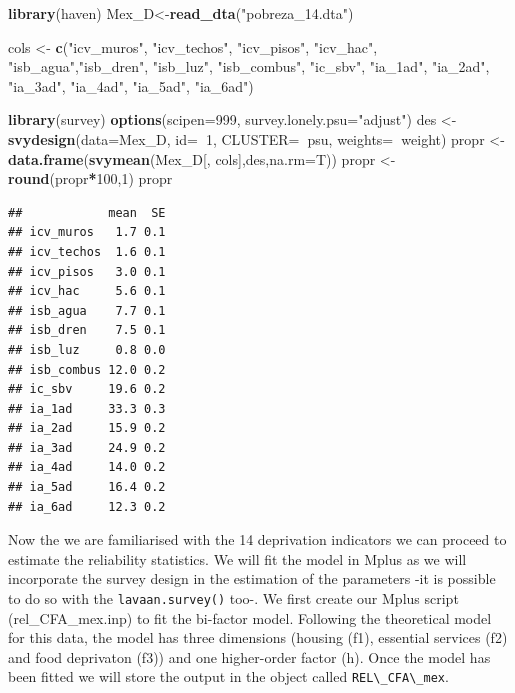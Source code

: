 \documentclass[]{book}
\newenvironment{Shaded}{\begin{snugshade}}{\end{snugshade}}
\newcommand{\DataTypeTok}[1]{\textcolor[rgb]{0.13,0.29,0.53}{#1}}
\newcommand{\DecValTok}[1]{\textcolor[rgb]{0.00,0.00,0.81}{#1}}
\newcommand{\KeywordTok}[1]{\textcolor[rgb]{0.13,0.29,0.53}{\textbf{#1}}}
\newcommand{\NormalTok}[1]{#1}
\newcommand{\OperatorTok}[1]{\textcolor[rgb]{0.81,0.36,0.00}{\textbf{#1}}}
\newcommand{\StringTok}[1]{\textcolor[rgb]{0.31,0.60,0.02}{#1}}
\begin{document}
\begin{Shaded}
\begin{Highlighting}[]
\KeywordTok{library}\NormalTok{(haven)}
\NormalTok{Mex_D<-}\KeywordTok{read_dta}\NormalTok{(}\StringTok{"pobreza_14.dta"}\NormalTok{)}

\NormalTok{cols <-}\StringTok{ }\KeywordTok{c}\NormalTok{(}\StringTok{"icv_muros"}\NormalTok{, }\StringTok{"icv_techos"}\NormalTok{, }\StringTok{"icv_pisos"}\NormalTok{, }\StringTok{"icv_hac"}\NormalTok{,}
          \StringTok{"isb_agua"}\NormalTok{,}\StringTok{"isb_dren"}\NormalTok{, }\StringTok{"isb_luz"}\NormalTok{, }\StringTok{"isb_combus"}\NormalTok{,}
          \StringTok{"ic_sbv"}\NormalTok{, }\StringTok{"ia_1ad"}\NormalTok{, }\StringTok{"ia_2ad"}\NormalTok{, }\StringTok{"ia_3ad"}\NormalTok{, }\StringTok{"ia_4ad"}\NormalTok{, }
          \StringTok{"ia_5ad"}\NormalTok{,  }\StringTok{"ia_6ad"}\NormalTok{)}

\KeywordTok{library}\NormalTok{(survey)}
\KeywordTok{options}\NormalTok{(}\DataTypeTok{scipen=}\DecValTok{999}\NormalTok{, }\DataTypeTok{survey.lonely.psu=}\StringTok{"adjust"}\NormalTok{)}
\NormalTok{des <-}\StringTok{ }\KeywordTok{svydesign}\NormalTok{(}\DataTypeTok{data=}\NormalTok{Mex_D, }\DataTypeTok{id=}\OperatorTok{~}\DecValTok{1}\NormalTok{, }\DataTypeTok{CLUSTER=}\OperatorTok{~}\NormalTok{psu, }\DataTypeTok{weights=}\OperatorTok{~}\NormalTok{weight)}
\NormalTok{propr <-}\StringTok{ }\KeywordTok{data.frame}\NormalTok{(}\KeywordTok{svymean}\NormalTok{(Mex_D[, cols],des,}\DataTypeTok{na.rm=}\NormalTok{T))}
\NormalTok{propr <-}\StringTok{ }\KeywordTok{round}\NormalTok{(propr}\OperatorTok{*}\DecValTok{100}\NormalTok{,}\DecValTok{1}\NormalTok{)}
\NormalTok{propr}
\end{Highlighting}
\end{Shaded}

\begin{verbatim}
##            mean  SE
## icv_muros   1.7 0.1
## icv_techos  1.6 0.1
## icv_pisos   3.0 0.1
## icv_hac     5.6 0.1
## isb_agua    7.7 0.1
## isb_dren    7.5 0.1
## isb_luz     0.8 0.0
## isb_combus 12.0 0.2
## ic_sbv     19.6 0.2
## ia_1ad     33.3 0.3
## ia_2ad     15.9 0.2
## ia_3ad     24.9 0.2
## ia_4ad     14.0 0.2
## ia_5ad     16.4 0.2
## ia_6ad     12.3 0.2
\end{verbatim}

Now the we are familiarised with the 14 deprivation indicators we can proceed to estimate the reliability statistics. We will fit the model in Mplus as we will incorporate the survey design in the estimation of the parameters -it is possible to do so with the \texttt{lavaan.survey()} too-. We first create our Mplus script (rel\_CFA\_mex.inp) to fit the bi-factor model. Following the theoretical model for this data, the model has three dimensions (housing (f1), essential services (f2) and food deprivaton (f3)) and one higher-order factor (h). Once the model has been fitted we will store the output in the object called \texttt{REL\textbackslash{}\_CFA\textbackslash{}\_mex}.
\end{document}
